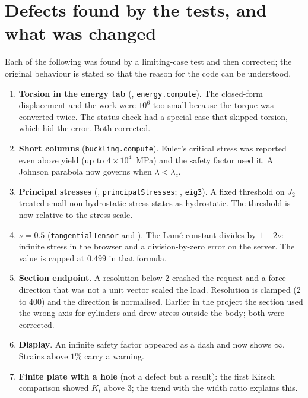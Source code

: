 \section{Defects found by the tests, and what was changed}
Each of the following was found by a limiting-case test and then corrected; the original behaviour is stated so that the reason for the code can be understood.
\begin{enumerate}
\item \textbf{Torsion in the energy tab} (, \texttt{energy.compute}). The closed-form displacement and the work were $10^6$ too small because the torque was converted twice. The status check had a special case that skipped torsion, which hid the error. Both corrected.
\item \textbf{Short columns} (\texttt{buckling.compute}). Euler's critical stress was reported even above yield (up to $4\times10^4$~MPa) and the safety factor used it. A Johnson parabola now governs when $\lambda<\lambda_c$.
\item \textbf{Principal stresses} (, \texttt{principalStresses}; , \texttt{eig3}). A fixed threshold on $J_2$ treated small non-hydrostatic stress states as hydrostatic. The threshold is now relative to the stress scale.
\item \textbf{$\nu=0.5$} (\texttt{tangentialTensor} and ). The Lam\'e constant divides by $1-2\nu$: infinite stress in the browser and a division-by-zero error on the server. The value is capped at $0.499$ in that formula.
\item \textbf{Section endpoint}. A resolution below 2 crashed the request and a force direction that was not a unit vector scaled the load. Resolution is clamped (2 to 400) and the direction is normalised. Earlier in the project the section used the wrong axis for cylinders and drew stress outside the body; both were corrected.
\item \textbf{Display}. An infinite safety factor appeared as a dash and now shows $\infty$. Strains above $1\%$ carry a warning.
\item \textbf{Finite plate with a hole} (not a defect but a result): the first Kirsch comparison showed $K_t$ above $3$; the trend with the width ratio explains this.
\end{enumerate}

